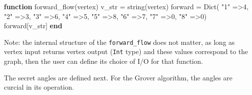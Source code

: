 \documentclass[
]{article}
\newenvironment{Shaded}{}{}
\newcommand{\FloatTok}[1]{\textcolor[rgb]{0.25,0.63,0.44}{#1}}
\newcommand{\FunctionTok}[1]{\textcolor[rgb]{0.02,0.16,0.49}{#1}}
\newcommand{\KeywordTok}[1]{\textcolor[rgb]{0.00,0.44,0.13}{\textbf{#1}}}
\newcommand{\NormalTok}[1]{#1}
\newcommand{\OperatorTok}[1]{\textcolor[rgb]{0.40,0.40,0.40}{#1}}
\newcommand{\StringTok}[1]{\textcolor[rgb]{0.25,0.44,0.63}{#1}}
\begin{document}
\begin{Shaded}
\begin{Highlighting}[]
    \KeywordTok{function} \FunctionTok{forward\_flow}\NormalTok{(vertex)}
\NormalTok{        v\_str }\OperatorTok{=} \FunctionTok{string}\NormalTok{(vertex)}
\NormalTok{        forward }\OperatorTok{=} \FunctionTok{Dict}\NormalTok{(}
            \StringTok{"1"} \OperatorTok{=\textgreater{}}\FloatTok{4}\NormalTok{,}
            \StringTok{"2"} \OperatorTok{=\textgreater{}}\FloatTok{3}\NormalTok{,}
            \StringTok{"3"} \OperatorTok{=\textgreater{}}\FloatTok{6}\NormalTok{,}
            \StringTok{"4"} \OperatorTok{=\textgreater{}}\FloatTok{5}\NormalTok{,}
            \StringTok{"5"} \OperatorTok{=\textgreater{}}\FloatTok{8}\NormalTok{,}
            \StringTok{"6"} \OperatorTok{=\textgreater{}}\FloatTok{7}\NormalTok{,}
            \StringTok{"7"} \OperatorTok{=\textgreater{}}\FloatTok{0}\NormalTok{,}
            \StringTok{"8"} \OperatorTok{=\textgreater{}}\FloatTok{0}\NormalTok{)}
\NormalTok{        forward[v\_str]}
    \KeywordTok{end}
\end{Highlighting}
\end{Shaded}

Note: the internal structure of the \texttt{forward\_flow} does not
matter, as long as vertex input returns vertex output (\texttt{Int}
type) and these values correspond to the graph, then the user can define
its choice of I/O for that function.

The secret angles are defined next. For the Grover algorithm, the angles
are curcial in its operation.
\end{document}
